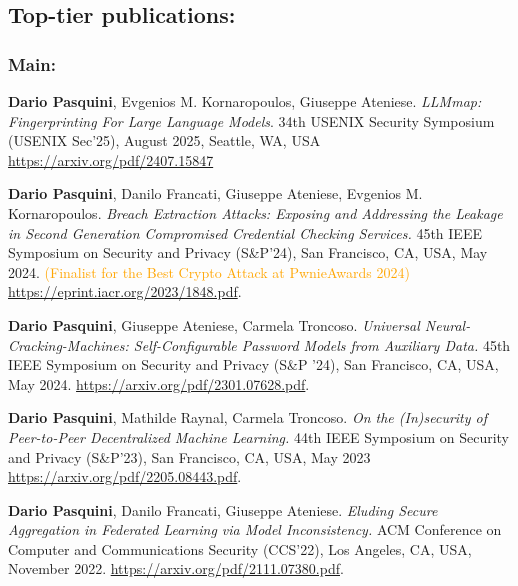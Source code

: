 \documentclass[margin, 10pt]{article} %
\begin{document}
\ifml
\subsection*{Top-tier publications:}
\vspace{.5cm}
\else
\subsubsection{Main:}
\fi


\begin{thebibliography}{99}


	\textbf{Dario Pasquini},  Evgenios M. Kornaropoulos, Giuseppe Ateniese. \textit{LLMmap: Fingerprinting For Large Language Models}. 34th USENIX Security Symposium (USENIX Sec'25), August 2025, Seattle, WA, USA \url{https://arxiv.org/pdf/2407.15847}

\textbf{Dario Pasquini}, Danilo Francati, Giuseppe Ateniese, Evgenios M. Kornaropoulos.
\textit{Breach Extraction Attacks: Exposing and Addressing the Leakage in Second Generation Compromised Credential Checking Services.}
45th IEEE Symposium on Security and Privacy (S\&P'24), San Francisco, CA, USA, May 2024. \textcolor{orange}{(Finalist for the Best Crypto Attack at PwnieAwards 2024)} \url{https://eprint.iacr.org/2023/1848.pdf}. 

\textbf{Dario Pasquini}, Giuseppe Ateniese,  Carmela Troncoso. \textit{Universal Neural-Cracking-Machines: Self-Configurable Password Models from Auxiliary Data.} 45th IEEE Symposium on Security and Privacy (S\&P '24), San Francisco, CA, USA, May 2024. \url{https://arxiv.org/pdf/2301.07628.pdf}. 

\textbf{Dario Pasquini}, Mathilde Raynal, Carmela Troncoso. \textit{On the (In)security of Peer-to-Peer Decentralized Machine Learning.} 44th IEEE Symposium on Security and Privacy (S\&P'23), San Francisco, CA, USA, May 2023 \url{https://arxiv.org/pdf/2205.08443.pdf}. 

\textbf{Dario Pasquini}, Danilo Francati, Giuseppe Ateniese. \textit{Eluding Secure Aggregation in Federated Learning via Model Inconsistency.} ACM Conference on Computer and Communications Security (CCS'22), Los Angeles, CA, USA, November 2022. \url{https://arxiv.org/pdf/2111.07380.pdf}. 


\end{thebibliography}
\end{document}
